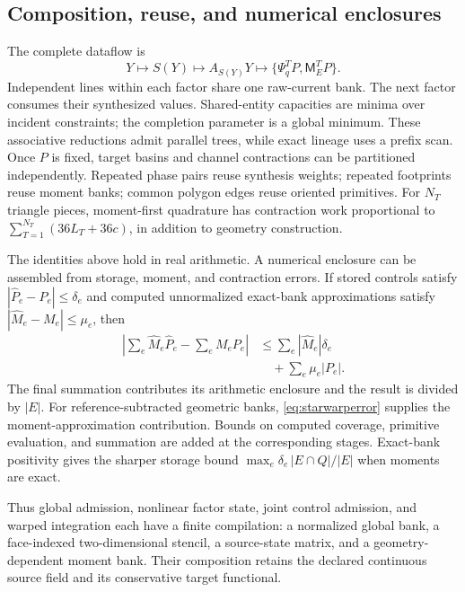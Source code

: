 \documentclass[journal]{IEEEtran}
\begin{document}
\subsection{Composition, reuse, and numerical enclosures}
The complete dataflow is
\begin{equation}
 Y\longmapsto S(Y)\longmapsto A_{S(Y)}Y
 \longmapsto\{\Psi_q^TP,\mathsf M_E^TP\}.
\end{equation}
Independent lines within each factor share one raw-current bank. The next
factor consumes their synthesized values. Shared-entity capacities are
minima over incident constraints; the completion parameter is a global
minimum. These associative reductions admit parallel trees, while exact
lineage uses a prefix scan. Once $P$ is fixed, target basins and channel
contractions can be partitioned independently. Repeated phase pairs reuse
synthesis weights; repeated footprints reuse moment banks; common polygon
edges reuse oriented primitives. For $N_T$ triangle pieces, moment-first
quadrature has contraction work proportional to
$\sum_{T=1}^{N_T}(36L_T+36c)$, in addition to geometry construction.

The identities above hold in real arithmetic. A numerical enclosure can be
assembled from storage, moment, and contraction errors. If stored controls
satisfy $|\widehat P_e-P_e|\leq\delta_e$ and computed unnormalized exact-bank
approximations satisfy $|\widehat M_e-M_e|\leq\mu_e$, then
\begin{align}
 \left|\sum_e\widehat M_e\widehat P_e-\sum_eM_eP_e\right|
 &\leq\sum_e|\widehat M_e|\delta_e\nonumber\\
 &\quad+\sum_e\mu_e|P_e|.
\end{align}
The final summation contributes its arithmetic enclosure and the result is
divided by $|E|$. For reference-subtracted geometric banks,
\eqref{eq:starwarperror} supplies the moment-approximation contribution.
Bounds on computed coverage, primitive evaluation, and summation are added
at the corresponding stages. Exact-bank positivity gives the sharper storage
bound $\max_e\delta_e\,|E\cap Q|/|E|$ when moments are exact.

Thus global admission, nonlinear factor state, joint control admission, and
warped integration each have a finite compilation: a normalized global bank,
a face-indexed two-dimensional stencil, a source-state matrix, and a
geometry-dependent moment bank. Their composition retains the declared
continuous source field and its conservative target functional.
\end{document}
